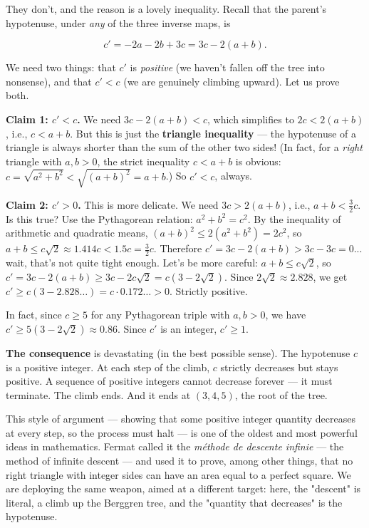\documentclass[11pt,openany]{book}
\theoremstyle{definition}
\theoremstyle{plain}
\theoremstyle{remark}
\begin{document}
They don't, and the reason is a lovely inequality. Recall that the parent's hypotenuse, under \textit{any} of the three inverse maps, is

$$c' = -2a - 2b + 3c = 3c - 2(a + b).$$

We need two things: that $c'$ is \textit{positive} (we haven't fallen off the tree into nonsense), and that $c' < c$ (we are genuinely climbing upward). Let us prove both.

\textbf{Claim 1: $c' < c$.} We need $3c - 2(a+b) < c$, which simplifies to $2c < 2(a+b)$, i.e., $c < a + b$. But this is just the \textbf{triangle inequality} — the hypotenuse of a triangle is always shorter than the sum of the other two sides! (In fact, for a \textit{right} triangle with $a, b > 0$, the strict inequality $c < a + b$ is obvious: $c = \sqrt{a^2 + b^2} < \sqrt{(a+b)^2} = a + b$.) So $c' < c$, always.

\textbf{Claim 2: $c' > 0$.} This is more delicate. We need $3c > 2(a+b)$, i.e., $a + b < \frac{3}{2}c$. Is this true? Use the Pythagorean relation: $a^2 + b^2 = c^2$. By the inequality of arithmetic and quadratic means, $(a + b)^2 \leq 2(a^2 + b^2) = 2c^2$, so $a + b \leq c\sqrt{2} \approx 1.414c < 1.5c = \frac{3}{2}c$. Therefore $c' = 3c - 2(a+b) > 3c - 3c = 0$... wait, that's not quite tight enough. Let's be more careful: $a + b \leq c\sqrt{2}$, so $c' = 3c - 2(a+b) \geq 3c - 2c\sqrt{2} = c(3 - 2\sqrt{2})$. Since $2\sqrt{2} \approx 2.828$, we get $c' \geq c(3 - 2.828\ldots) = c \cdot 0.172\ldots > 0$. Strictly positive.

In fact, since $c \geq 5$ for any Pythagorean triple with $a, b > 0$, we have $c' \geq 5(3 - 2\sqrt{2}) \approx 0.86$. Since $c'$ is an integer, $c' \geq 1$.

\textbf{The consequence} is devastating (in the best possible sense). The hypotenuse $c$ is a positive integer. At each step of the climb, $c$ strictly decreases but stays positive. A sequence of positive integers cannot decrease forever — it must terminate. The climb ends. And it ends at $(3, 4, 5)$, the root of the tree.

This style of argument — showing that some positive integer quantity decreases at every step, so the process must halt — is one of the oldest and most powerful ideas in mathematics. Fermat called it the \textit{méthode de descente infinie} — the method of infinite descent — and used it to prove, among other things, that no right triangle with integer sides can have an area equal to a perfect square. We are deploying the same weapon, aimed at a different target: here, the "descent" is literal, a climb up the Berggren tree, and the "quantity that decreases" is the hypotenuse.
\end{document}
